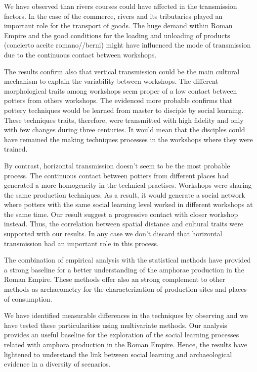 \documentclass[review]{elsarticle}
\begin{document}
We have observed than rivers courses could have affected in the transmission factors. In the case of the commerce, rivers and its tributaries played an important role for the transport of goods. The huge demand within Roman Empire and the good conditions for the loading and unloading of products (concierto aceite romano//berni) might have influenced the mode of transmission due to the continuous contact between workshops. 

The results confirm also that vertical transmission could be the main cultural mechanism to explain the variability between workshops. The different morphological traits among workshops seem proper of a low contact between potters from others workshops. The evidenced more probable confirms that pottery techniques would be learned from master to disciple by social learning. These techniques traits, therefore, were transmitted with high fidelity and only with few changes during three centuries. It would mean that the disciples could have remained the making techniques processes in the workshops where they were trained.  

By contrast, horizontal transmission doesn't seem to be the most probable process. The continuous contact between potters from different places had generated a more homogeneity in the technical practises. Workshops were sharing the same production techniques. As a result, it would generate a social network where potters with the same social learning level worked in different workshops at the same time. Our result suggest a progressive contact with closer workshop instead. Thus, the correlation between spatial distance and cultural traits were supported with our results. In any case we don't discard that horizontal transmission had an important role in this process.   

The combination of empirical analysis with the statistical methods have provided a strong baseline for a better understanding of the amphorae production in the Roman Empire. These methods offer also an strong complement to other methods as archaeometry for the characterization of production sites and places of consumption.  

We have identified measurable differences in the techniques by observing and we have tested these particularities using multivariate methods. Our analysis provides an useful baseline for the exploration of the social learning processes related with amphora production in the Roman Empire. Hence, the results have lightened to understand the link between social learning and archaeological evidence in a diversity of scenarios. 
\end{document}
